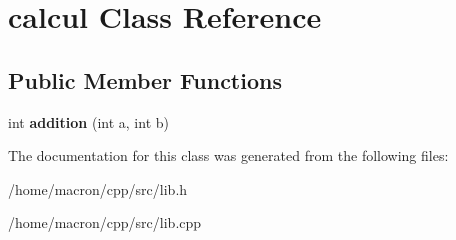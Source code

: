 \hypertarget{classcalcul}{}\section{calcul Class Reference}
\label{classcalcul}
\subsection*{Public Member Functions}
\begin{DoxyCompactItemize}
\item 
\mbox{\label{classcalcul_a22625728cbd10b7511c45ad0aeaeefa4}} 
int {\bfseries addition} (int a, int b)
\end{DoxyCompactItemize}


The documentation for this class was generated from the following files\+:\begin{DoxyCompactItemize}
\item 
/home/macron/cpp/src/lib.\+h\item 
/home/macron/cpp/src/lib.\+cpp\end{DoxyCompactItemize}
